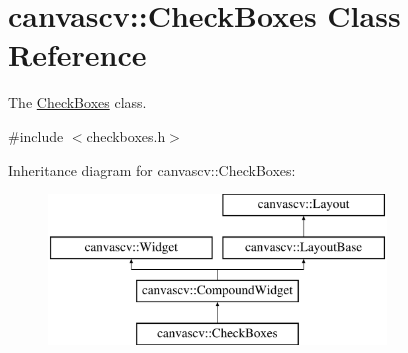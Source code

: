 \hypertarget{classcanvascv_1_1CheckBoxes}{}\section{canvascv\+:\+:Check\+Boxes Class Reference}
\label{classcanvascv_1_1CheckBoxes}


The \hyperlink{classcanvascv_1_1CheckBoxes}{Check\+Boxes} class.  




{\ttfamily \#include $<$checkboxes.\+h$>$}

Inheritance diagram for canvascv\+:\+:Check\+Boxes\+:\begin{figure}[H]
\begin{center}
\leavevmode
\includegraphics[height=4.000000cm]{classcanvascv_1_1CheckBoxes}
\end{center}
\end{figure}
